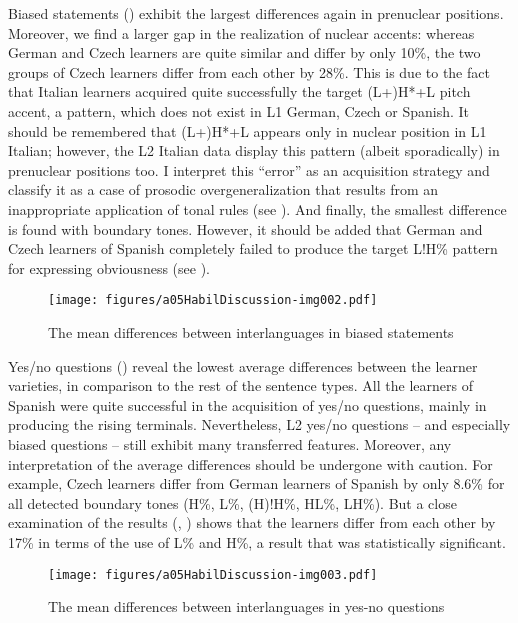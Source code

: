Biased statements () exhibit the largest differences again in prenuclear positions. Moreover, we find a larger gap in the realization of nuclear accents: whereas German and Czech learners are quite similar and differ by only 10\%, the two groups of Czech learners differ from each other by 28\%. This is due to the fact that Italian learners acquired quite successfully the target (L+)H*+L pitch accent, a pattern, which does not exist in L1 German, Czech or Spanish. It should be remembered that (L+)H*+L appears only in nuclear position in L1 Italian; however, the L2 Italian data display this pattern (albeit sporadically) in prenuclear positions too. I interpret this “error” as an acquisition strategy and classify it as a case of prosodic overgeneralization that results from an inappropriate application of tonal rules (see ). And finally, the smallest difference is found with boundary tones. However, it should be added that German and Czech learners of Spanish completely failed to produce the target L!H\% pattern for expressing obviousness (see ).

\begin{figure}
\texttt{[image: figures/a05HabilDiscussion-img002.pdf]}
\caption{The mean differences between interlanguages in biased statements\label{fig:5.1b}}
\end{figure}

Yes/no questions () reveal the lowest average differences between the learner varieties, in comparison to the rest of the sentence types. All the learners of Spanish were quite successful in the acquisition of yes/no questions, mainly in producing the rising terminals. Nevertheless, L2 yes/no questions -- and especially biased questions -- still exhibit many transferred features. Moreover, any interpretation of the average differences should be undergone with caution. For example, Czech learners differ from German learners of Spanish by only 8.6\% for all detected boundary tones (H\%, L\%, (H)!H\%, HL\%, LH\%). But a close examination of the results (, ) shows that the learners differ from each other by 17\% in terms of the use of L\% and H\%, a result that was statistically significant.

\begin{figure}
\texttt{[image: figures/a05HabilDiscussion-img003.pdf]}
\caption{The mean differences between interlanguages in yes-no questions\label{fig:5.1c}}
\end{figure}

